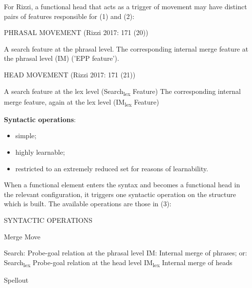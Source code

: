\documentclass[fleqn,10pt]{wlscirep}
\begin{document}
For Rizzi, a functional head that acts as a trigger of movement may have distinct pairs of features responsible for (1) and (2):

\begin{exe}
    \ex PHRASAL MOVEMENT (Rizzi 2017: 171 (20))
        \begin{xlist}
            \ex A search feature at the phrasal level.
            \ex The corresponding internal merge feature at the phrasal level (IM) ('EPP feature').
        \end{xlist}
\end{exe}

\begin{exe}
    \ex HEAD MOVEMENT (Rizzi 2017: 171 (21)) 
        \begin{xlist}
            \ex A search feature at the lex level (Search\textsubscript{lex} Feature)
            \ex The corresponding internal merge feature, again at the lex level (IM\textsubscript{lex} Feature)
        \end{xlist}
\end{exe}

\noindent\textbf{Syntactic operations}: 
\begin{itemize}
    \item \vspace*{-2mm} simple;
    \item \vspace*{-2mm} highly learnable;
    \item \vspace*{-2mm} restricted to an extremely reduced set for reasons of learnability.
\end{itemize}	

\noindent When a functional element enters the syntax and becomes a functional head in the relevant configuration, it triggers one syntactic operation on the structure which is built. The available operations are those in (3):

\begin{exe}
    \ex SYNTACTIC OPERATIONS
        \begin{xlist}
            \ex Merge
            \ex Move
                \begin{xlist}
                    \ex Search:	Probe-goal relation at the phrasal level
                    \ex IM:	Internal merge of phrases; or:
                    \ex Search\textsubscript{lex}	Probe-goal relation at the head level
                    \ex IM\textsubscript{lex}	Internal merge of heads
                \end{xlist}
            \ex Spellout
        \end{xlist}
    \end{exe}
\end{document}
